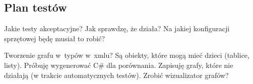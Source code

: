 \subsection{Plan testów}
Jakie testy akceptacyjne? Jak sprawdzę, że działa? Na jakiej konfiguracji sprzętowej będę musiał to robić?

Tworzenie grafu w~typów w~xmlu? Są obiekty, które mogą mieć dzieci (tablice, listy). Próbuję wygenerować C\# dla porównania. Zapisuję grafy, które nie działają (w trakcie automatycznych testów). Zrobić wizualizator grafów?


%
%
%
%
%
%
%
%
%
%



